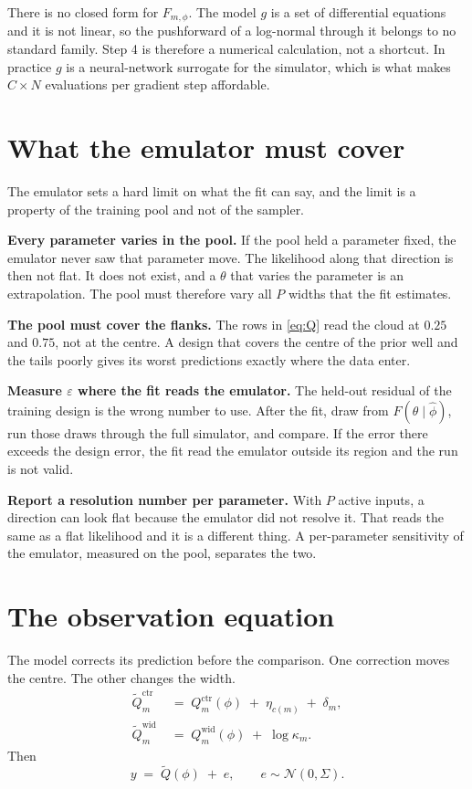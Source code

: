 \documentclass[11pt]{article}
\newcommand{\Ncal}{\mathcal{N}}
\newcommand{\ctr}{\mathrm{ctr}}
\newcommand{\wid}{\mathrm{wid}}
\begin{document}
There is no closed form for $F_{m,\phi}$. The model $g$ is a set of differential
equations and it is not linear, so the pushforward of a log-normal through it
belongs to no standard family. Step 4 is therefore a numerical calculation, not
a shortcut. In practice $g$ is a neural-network surrogate for the simulator,
which is what makes $C\times N$ evaluations per gradient step affordable.

\section{What the emulator must cover}
\label{sec:emulator}

The emulator sets a hard limit on what the fit can say, and the limit is a
property of the training pool and not of the sampler.

\textbf{Every parameter varies in the pool.} If the pool held a parameter fixed,
the emulator never saw that parameter move. The likelihood along that direction
is then not flat. It does not exist, and a $\theta$ that varies the parameter is
an extrapolation. The pool must therefore vary all $P$ widths that the fit
estimates.

\textbf{The pool must cover the flanks.} The rows in \eqref{eq:Q} read the cloud
at $0.25$ and $0.75$, not at the centre. A design that covers the centre of the
prior well and the tails poorly gives its worst predictions exactly where the
data enter.

\textbf{Measure $\varepsilon$ where the fit reads the emulator.} The held-out
residual of the training design is the wrong number to use. After the fit, draw
from $F(\theta\mid\hat\phi)$, run those draws through the full simulator, and
compare. If the error there exceeds the design error, the fit read the emulator
outside its region and the run is not valid.

\textbf{Report a resolution number per parameter.} With $P$ active inputs, a
direction can look flat because the emulator did not resolve it. That reads the
same as a flat likelihood and it is a different thing. A per-parameter
sensitivity of the emulator, measured on the pool, separates the two.

\section{The observation equation}
\label{sec:obs}

The model corrects its prediction before the comparison. One correction moves the
centre. The other changes the width.
\begin{align}
\widetilde Q^\ctr_m &\;=\; Q^\ctr_m(\phi) \;+\; \eta_{c(m)} \;+\; \delta_m ,
\label{eq:corrctr}\\
\widetilde Q^\wid_m &\;=\; Q^\wid_m(\phi) \;+\; \log\kappa_m .
\label{eq:corrwid}
\end{align}
Then
\begin{equation}
y \;=\; \widetilde Q(\phi) \;+\; e,
\qquad e\sim\Ncal(0,\Sigma).
\label{eq:obs}
\end{equation}
\end{document}
